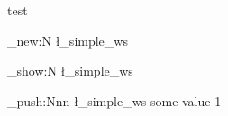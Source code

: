 \documentclass{article}
\begin{document}
test\par

\ws_new:N \l_simple_ws

\ws_show:N \l_simple_ws

\ws_push:Nnn \l_simple_ws
  { some value }
  { 1 }

\end{document}
